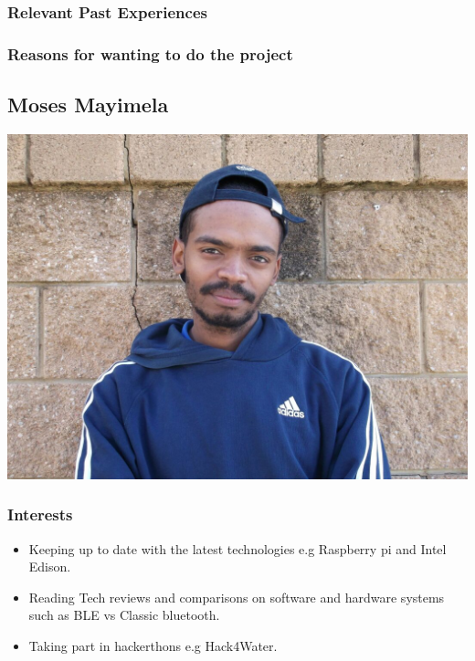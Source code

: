 \documentclass{scrartcl}
\begin{document}
\subsubsection{Relevant Past Experiences}
\subsubsection{Reasons for wanting to do the project}
\newpage
\subsection{Moses Mayimela}
\includegraphics[width=\textwidth]{images/Moses}
\subsubsection{Interests}
\begin{itemize}
\item Keeping up to date with the latest technologies e.g Raspberry pi and Intel Edison.
\item Reading Tech reviews and comparisons on software and hardware systems such as BLE vs Classic bluetooth.
\item Taking part in hackerthons e.g Hack4Water.
\end{itemize}
\end{document}

